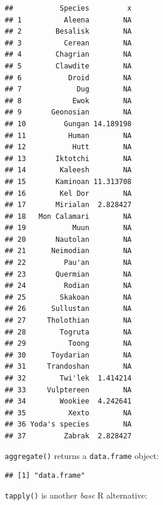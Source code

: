 \documentclass[]{gitbook}
\newenvironment{Shaded}{\begin{snugshade}}{\end{snugshade}}
\newcommand{\DataTypeTok}[1]{\textcolor[rgb]{0.13,0.29,0.53}{#1}}
\newcommand{\KeywordTok}[1]{\textcolor[rgb]{0.13,0.29,0.53}{\textbf{#1}}}
\newcommand{\NormalTok}[1]{#1}
\newcommand{\OperatorTok}[1]{\textcolor[rgb]{0.81,0.36,0.00}{\textbf{#1}}}
\begin{document}
\begin{verbatim}
##           Species         x
## 1          Aleena        NA
## 2        Besalisk        NA
## 3          Cerean        NA
## 4        Chagrian        NA
## 5        Clawdite        NA
## 6           Droid        NA
## 7             Dug        NA
## 8            Ewok        NA
## 9       Geonosian        NA
## 10         Gungan 14.189198
## 11          Human        NA
## 12           Hutt        NA
## 13       Iktotchi        NA
## 14        Kaleesh        NA
## 15       Kaminoan 11.313708
## 16        Kel Dor        NA
## 17       Mirialan  2.828427
## 18   Mon Calamari        NA
## 19           Muun        NA
## 20       Nautolan        NA
## 21      Neimodian        NA
## 22         Pau'an        NA
## 23       Quermian        NA
## 24         Rodian        NA
## 25        Skakoan        NA
## 26      Sullustan        NA
## 27     Tholothian        NA
## 28        Togruta        NA
## 29          Toong        NA
## 30      Toydarian        NA
## 31     Trandoshan        NA
## 32        Twi'lek  1.414214
## 33     Vulptereen        NA
## 34        Wookiee  4.242641
## 35          Xexto        NA
## 36 Yoda's species        NA
## 37         Zabrak  2.828427
\end{verbatim}

\texttt{aggregate()} returns a \texttt{data.frame} object:

\begin{Shaded}
\end{Shaded}

\begin{verbatim}
## [1] "data.frame"
\end{verbatim}

\texttt{tapply()} is another \emph{base} R alternative:

\begin{Shaded}
\end{Shaded}
\end{document}
